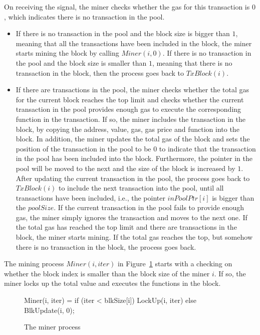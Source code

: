 \documentclass{KERauth}
\begin{document}
On receiving the signal, the miner checks whether the gas for this transaction is $0$, which indicates there is no transaction in the pool.
%
\begin{itemize}
\item If there is no transaction in the pool and the block size is bigger than $1$, meaning that all the transactions have been included in the block, the miner starts mining the block by calling $Miner(i, 0)$. If there is no transaction in the pool and the block size is smaller than $1$, meaning that there is no transaction in the block, then the process goes back to $TxBlock(i)$.

\item If there are transactions in the pool, the miner checks whether the total gas for the current block reaches the top limit and checks whether the current transaction in the pool provides enough gas to execute the corresponding function in the transaction. If so, the miner includes the transaction in the block, by copying the address, value, gas, gas price and function into the block. In addition, the miner updates the total gas of the block and sets the position of the transaction in the pool to be $0$ to indicate that the transaction in the pool has been included into the block. Furthermore, the pointer in the pool will be moved to the next and the size of the block is increased by $1$. After updating the current transaction in the pool, the process goes back to $TxBlock(i)$ to include the next transaction into the pool, until all transactions have been included, i.e., the pointer $inPoolPtr[i]$ is bigger than the $poolSize$. If the current transaction in the pool fails to provide enough gas, the miner simply ignores the transaction and moves to the next one. If the total gas has reached the top limit and there are transactions in the block, the miner starts mining. If the total gas reaches the top, but somehow there is no transaction in the block, the process goes back.
\end{itemize}

The mining process $Miner(i, iter)$ in Figure~\ref{fig:miner} starts with a checking on whether the block index is smaller than the block size of the miner $i$. If so, the miner locks up the total value and executes the functions in the block. 

\begin{figure}[h]
\begin{center}
\begin{boxedverbatim}
Miner(i, iter) = if (iter < blkSize[i]) {LockUp(i, iter)} 
                 else { BlkUpdate(i, 0)};
\end{boxedverbatim}
\end{center}
\caption{The miner process}\label{fig:miner}
\end{figure}
\end{document}
